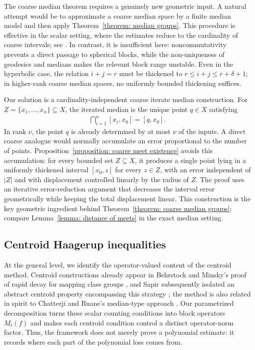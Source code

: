 \documentclass[12pt,reqno]{amsart}
\numberwithin{equation}{section}
\begin{document}
The coarse median theorem requires a genuinely new geometric input. A natural attempt would be to approximate a coarse median space by a finite median model and then apply Theorem~\ref{theorem: median groups}. This procedure is effective in the scalar setting, where the estimates reduce to the cardinality of coarse intervals; see \cite[Section 9]{Bowditch2014embedding}. In contrast, it is insufficient here: noncommutativity prevents a direct passage to spherical blocks, while the non-uniqueness of geodesics and medians makes the relevant block range unstable. Even in the hyperbolic case, the relation $i+j=r$ must be thickened to $r\le i+j\le r+\delta+1$; in higher-rank coarse median spaces, no uniformly bounded thickening suffices.

Our solution is a cardinality-independent coarse iterate median construction. For $Z=\{x_1,\ldots,x_n\}\subseteq X$, the iterated median is the unique point $q\in X$ satisfying
\begin{align*}
    \bigcap_{i=1}^n [x_i,x_0]=[q,x_0].
\end{align*}
In rank $\nu$, the point $q$ is already determined by at most $\nu$ of the inputs. A direct coarse analogue would normally accumulate an error proportional to the number of points. Proposition~\ref{proposition: coarse meet existence} avoids this accumulation: for every bounded set $Z\subseteq X$, it produces a single point lying in a uniformly thickened interval $[x_0,z]$ for every $z\in Z$, with an error independent of $|Z|$ and with displacement controlled linearly by the radius of $Z$. The proof uses an iterative error-reduction argument that decreases the interval error geometrically while keeping the total displacement linear. This construction is the key geometric ingredient behind Theorem~\ref{theorem: coarse median groups}; compare Lemma~\ref{lemma: distance of meets} in the exact median setting.

\subsection{Centroid Haagerup inequalities} At the general level, we identify the operator-valued content of the centroid method. Centroid constructions already appear in Behrstock and Minsky's proof of rapid decay for mapping class groups \cite{BehrstockMinsky2011centroid}, and Sapir subsequently isolated an abstract centroid property encompassing this strategy \cite{Sapir2015centroids}; the method is also related in spirit to Chatterji and Ruane's median-type approach \cite{ChatterjiRuane2005median}. Our parametrized decomposition turns these scalar counting conditions into block operators $M_t(f)$ and makes each centroid condition control a distinct operator-norm factor. Thus, the framework does not merely prove a polynomial estimate: it records where each part of the polynomial loss comes from.
\end{document}

